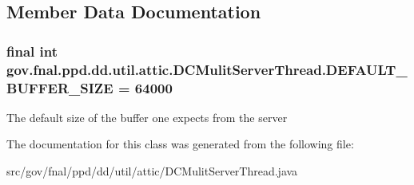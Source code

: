\subsection{Member Data Documentation}
\hypertarget{classgov_1_1fnal_1_1ppd_1_1dd_1_1util_1_1attic_1_1DCMulitServerThread_a6d2b224dfd806a916b2d21041777f00b}{
\subsubsection[{D\-E\-F\-A\-U\-L\-T\-\_\-\-B\-U\-F\-F\-E\-R\-\_\-\-S\-I\-Z\-E}]{\setlength{\rightskip}{0pt plus 5cm}final int gov.\-fnal.\-ppd.\-dd.\-util.\-attic.\-D\-C\-Mulit\-Server\-Thread.\-D\-E\-F\-A\-U\-L\-T\-\_\-\-B\-U\-F\-F\-E\-R\-\_\-\-S\-I\-Z\-E = 64000\hspace{0.3cm}{\ttfamily [static]}}}\label{classgov_1_1fnal_1_1ppd_1_1dd_1_1util_1_1attic_1_1DCMulitServerThread_a6d2b224dfd806a916b2d21041777f00b}
The default size of the buffer one expects from the server 

The documentation for this class was generated from the following file\-:\begin{DoxyCompactItemize}
\item 
src/gov/fnal/ppd/dd/util/attic/D\-C\-Mulit\-Server\-Thread.\-java\end{DoxyCompactItemize}

